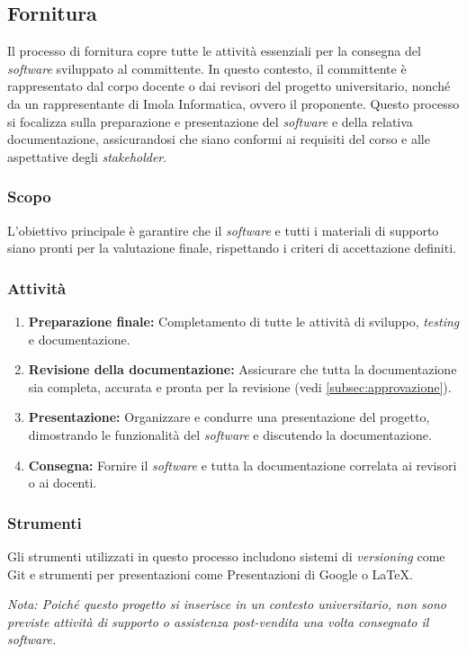 \subsection{Fornitura}
Il processo di fornitura copre tutte le attività essenziali per la consegna del \textit{software} sviluppato al committente.
In questo contesto, il committente è rappresentato dal corpo docente o dai
revisori del progetto universitario, nonché da un rappresentante di Imola
Informatica, ovvero il proponente.
Questo processo si focalizza sulla preparazione e presentazione del \textit{software} e della relativa documentazione, assicurandosi che siano conformi ai requisiti del corso e alle aspettative degli \textit{stakeholder}.

\subsubsection{Scopo}
L'obiettivo principale è garantire che il \textit{software} e tutti i materiali
di supporto siano pronti per la valutazione finale, rispettando i criteri di
accettazione definiti.

\subsubsection{Attività}
\begin{enumerate}
	\item \textbf{Preparazione finale:} Completamento di tutte le attività di
	      sviluppo, \textit{testing} e documentazione.
	\item \textbf{Revisione della documentazione:} Assicurare che tutta la
	      documentazione sia completa, accurata e pronta per la revisione
	      (vedi \cref{subsec:approvazione}).
	\item \textbf{Presentazione:} Organizzare e condurre una presentazione del
	      progetto, dimostrando le funzionalità del \textit{software} e
	      discutendo la documentazione.
	\item \textbf{Consegna:} Fornire il \textit{software} e tutta la
	      documentazione correlata ai revisori o ai docenti.
\end{enumerate}

\subsubsection{Strumenti}
Gli strumenti utilizzati in questo processo includono sistemi di
\textit{versioning} come Git e strumenti per presentazioni come Presentazioni di Google o LaTeX.

\textit{Nota: Poiché questo progetto si inserisce in un contesto universitario,
	non sono previste attività di supporto o assistenza post-vendita una volta
	consegnato il \textit{software}.}
